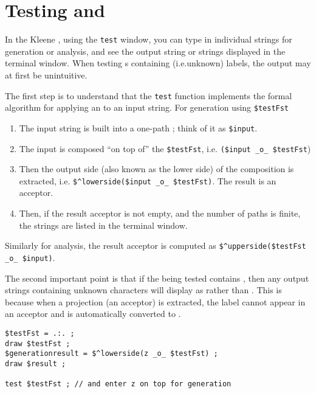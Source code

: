 \chapter{ \fsm{} Testing and }

\label{app:test}

In the Kleene , using the \texttt{test} window, you can type in
individual strings for generation or analysis, and see the output string
or strings displayed in the terminal window.  When testing \fsm{}s
containing  (i.e.\@ unknown) labels, the output may at first
be unintuitive. 

The first step is to understand that the \texttt{test} function implements
the formal algorithm for applying an \fsm{} to an input string.  For
generation using \verb!$testFst!

\begin{enumerate}
\item
The input string is built into a one-path \fsm{}; think of it as \verb!$input!.
\item
The input \fsm{} is composed ``on top of'' the \verb!$testFst!, i.e.\@ 
\verb!($input _o_ $testFst!)
\item
Then the output side (also known as the lower side) of the composition is extracted, i.e.\@
\verb!$^lowerside($input _o_ $testFst)!.  The result is an acceptor. 
\item
Then, if the result acceptor is not empty, and the number of paths is finite, the strings are listed in the
terminal window.
\end{enumerate}

\noindent
Similarly for analysis, the result acceptor is computed as 
\verb!$^upperside($testFst _o_ $input)!.

The second important point is that if the \fsm{} being tested contains
, then any output strings containing unknown characters
will display as  rather than .  This is
because when a projection (an acceptor) is extracted, the
 label cannot appear in an acceptor and is
automatically converted to .

\begin{Verbatim}[fontsize=\small]
$testFst = .:. ;
draw $testFst ;
$generationresult = $^lowerside(z _o_ $testFst) ;
draw $result ;

test $testFst ;	// and enter z on top for generation
\end{Verbatim}

